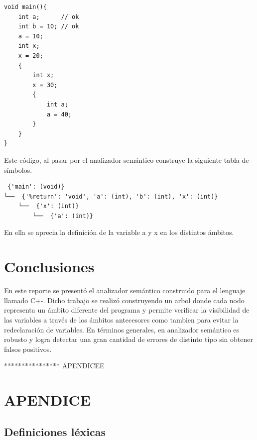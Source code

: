 \documentclass[12pt]{article}
\begin{document}
\begin{itemize}
\begin{itemize}
\begin{verbatim}
void main(){
    int a;      // ok
    int b = 10; // ok
    a = 10;
    int x;
    x = 20;
    {
        int x;
        x = 30;
        {
            int a;
            a = 40;
        }
    }
}
\end{verbatim}
Este c\'odigo, al pasar por el analizador semántico construye la siguiente tabla de símbolos.

\begin{verbatim}
 {'main': (void)}
└──  {'%return': 'void', 'a': (int), 'b': (int), 'x': (int)}
    └──  {'x': (int)}
        └──  {'a': (int)}
\end{verbatim}

En ella se aprecia la definición de la variable a y x en los distintos ámbitos.
\clearpage

\section*{Conclusiones}
En este reporte se presentó el analizador semántico construido para el lenguaje llamado C+-. Dicho trabajo se realizó construyendo un arbol donde cada nodo representa un ámbito diferente del programa y permite verificar la visibilidad de las variables a través de los ámbitos antecesores como tambien para evitar la redeclaración de variables.
En t\'erminos generales, en analizador semántico es robusto y logra detectar una gran cantidad de errores de distinto tipo sin obtener falsos positivos.










**************** APENDICEE
\section*{APENDICE}

\subsection*{Definiciones l\'exicas}


\end{itemize}
\end{itemize}
\end{document}
